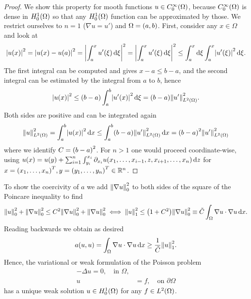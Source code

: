 \begin{proof}
	We show this property for mooth functions \(u \in C_0^\infty\parentheses*{\Omega}\), because \(C_0^\infty\parentheses*{\Omega}\) is dense in \(H_0^1\parentheses*{\Omega}\) so that any \(H_0^1\parentheses*{\Omega}\) function can be approximated by those.
	We restrict ourselves to \(n = 1\) (\(\nabla u = u'\)) and \(\Omega = \parentheses*{a, b}\).
	First, consider any \(x \in \Omega\) and look at
	\[
		\absolute*{u\parentheses*{x}}^2 = \absolute*{u\parentheses*{x} - u\parentheses*{a}}^2 = \absolute*{\int_a^x u'\parentheses*{\xi}\d\xi}^2 = \absolute*{\int_a^x u'\parentheses*{\xi}\d\xi}^2 \le \int_a^x \d\xi\int_a^x \absolute*{u'\parentheses*{\xi}}^2 \d\xi.
	\]
	The first integral can be computed and gives \(x - a \le b - a\), and the second integral can be estimated by the integral from \(a\) to \(b\), hence
	\[
		\absolute*{u\parentheses*{x}}^2 \le \parentheses*{b - a}\int_a^b \absolute*{u'\parentheses*{x}}^2 \d\xi = \parentheses*{b - a}\norm*{u'}_{L^2\parentheses*{\Omega}}^2.
	\]
	Both sides are positive and can be integrated again
	\[
		\norm*{u}_{L^2\parentheses*{\Omega}}^2 = \int_a^b \absolute*{u\parentheses*{x}}^2 \d x \le \int_a^b \parentheses*{b - a}\norm*{u'}_{L^2\parentheses*{\Omega}}^2 \d x = \parentheses*{b - a}^2 \norm*{u'}_{L^2\parentheses*{\Omega}}^2
	\]
	where we identify \(C = \parentheses*{b - a}^2\).
	For \(n > 1\) one would proceed coordinate-wise, using \(u\parentheses*{x} = u\parentheses*{y} + \sum_{i = 1}^n \int_{y_i}^{x_i}\partial_{x_i} u\parentheses*{x_1, \ldots, x_{i - 1}, z, x_{i + 1}, \ldots, x_n}\d z\) for \(x = \parentheses*{x_1, \ldots, x_n}^T, y = \parentheses*{y_1, \ldots, y_n}^T \in \R^n\).
\end{proof}

\begin{example}
	To show the coercivity of \(a\) we add \(\norm*{\nabla u}_0^2\) to both sides of the square of the Poincare inequality to find
	\[
		\norm*{u}_0^2 + \norm*{\nabla u}_0^2 \le C^2 \norm*{\nabla u}_0^2 + \norm*{\nabla u}_0^2 \iff \norm*{u}_1^2 \le \parentheses*{1 + C^2}\norm*{\nabla u}_0^2 \equiv \tilde{C}\int_\Omega \nabla u \cdot \nabla u\d x.
	\]
	Reading backwards we obtain as desired
	\[
		a\parentheses*{u, u} = \int_\Omega \nabla u \cdot \nabla u\d x \ge \frac{1}{\tilde{C}}\norm*{u}_1^2.
	\]
	Hence, the variational or weak formulation of the Poisson problem
	\begin{align*}
		-\Delta u = 0, \quad \text{in }\Omega,\\
		u &= f, \quad \text{on }\partial\Omega
	\end{align*}
	has a unique weak solution \(u \in H_0^1\parentheses*{\Omega}\) for any \(f \in L^2\parentheses*{\Omega}\).
\end{example}


